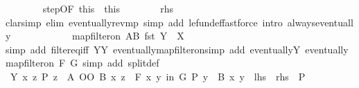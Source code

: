 \begin{isabellebody}
\ \ \ \ \ \ \isamarkupfalse%
\ step{\isacharbrackleft}{\kern0pt}OF\ this{\isacharparenleft}{\kern0pt}{}{\isacharcomma}{\kern0pt}\ {}{\isacharparenright}{\kern0pt}{\isacharbrackright}{\kern0pt}\ this{\isacharparenleft}{\kern0pt}{}{\isacharparenright}{\kern0pt}\isanewline
\ \ \ \ \ \ \isamarkupfalse%
\ {\isacharquery}{\kern0pt}rhs\ \isamarkupfalse%
{\isacharparenleft}{\kern0pt}clarsimp\ elim{\isacharbang}{\kern0pt}{\isacharcolon}{\kern0pt}\ eventually{\isacharunderscore}{\kern0pt}rev{\isacharunderscore}{\kern0pt}mp\ simp\ add{\isacharcolon}{\kern0pt}\ le{\isacharunderscore}{\kern0pt}fun{\isacharunderscore}{\kern0pt}def{\isacharparenright}{\kern0pt}{\isacharparenleft}{\kern0pt}fastforce\ intro{\isacharcolon}{\kern0pt}\ always{\isacharunderscore}{\kern0pt}eventually{\isacharparenright}{\kern0pt}\isanewline
\ \ \ \ \isamarkupfalse%
\isanewline
\ \ \ \ \isamarkupfalse%
\ \isamarkupfalse%
\ {\isachardoublequoteopen}map{\isacharunderscore}{\kern0pt}filter{\isacharunderscore}{\kern0pt}on\ {\isacharquery}{\kern0pt}AB\ fst\ Y\ {\isacharequal}{\kern0pt}\ {\isacharquery}{\kern0pt}X{\isachardoublequoteclose}\isanewline
\ \ \ \ \ \ \isamarkupfalse%
{\isacharparenleft}{\kern0pt}simp\ add{\isacharcolon}{\kern0pt}\ filter{\isacharunderscore}{\kern0pt}eq{\isacharunderscore}{\kern0pt}iff\ YY\ eventually{\isacharunderscore}{\kern0pt}map{\isacharunderscore}{\kern0pt}filter{\isacharunderscore}{\kern0pt}on{\isacharparenright}{\kern0pt}{\isacharparenleft}{\kern0pt}simp\ add{\isacharcolon}{\kern0pt}\ eventually{\isacharunderscore}{\kern0pt}Y\ eventually{\isacharunderscore}{\kern0pt}map{\isacharunderscore}{\kern0pt}filter{\isacharunderscore}{\kern0pt}on\ F\ G{\isacharsemicolon}{\kern0pt}\ simp\ add{\isacharcolon}{\kern0pt}\ split{\isacharunderscore}{\kern0pt}def{\isacharparenright}{\kern0pt}\isanewline
\isanewline
\ \ \ \ \isamarkupfalse%
\ {\isachardoublequoteopen}{\isacharquery}{\kern0pt}Y\ {\isacharparenleft}{\kern0pt}{\isasymlambda}{\isacharparenleft}{\kern0pt}x{\isacharcomma}{\kern0pt}\ z{\isacharparenright}{\kern0pt}{\isachardot}{\kern0pt}\ P\ z\ {\isasymand}\ {\isacharparenleft}{\kern0pt}A\ OO\ B{\isacharparenright}{\kern0pt}\ x\ z{\isacharparenright}{\kern0pt}\ {\isasymlongleftrightarrow}\ {\isacharparenleft}{\kern0pt}{\isasymforall}\isactrlsub F\ {\isacharparenleft}{\kern0pt}x{\isacharcomma}{\kern0pt}\ y{\isacharparenright}{\kern0pt}\ in\ G{\isachardot}{\kern0pt}\ P\ y\ {\isasymand}\ B\ x\ y{\isacharparenright}{\kern0pt}{\isachardoublequoteclose}\ {\isacharparenleft}{\kern0pt}\ {\isachardoublequoteopen}{\isacharquery}{\kern0pt}lhs\ {\isacharequal}{\kern0pt}\ {\isacharquery}{\kern0pt}rhs{\isachardoublequoteclose}{\isacharparenright}{\kern0pt}\ \ P\isanewline

\end{isabellebody}
